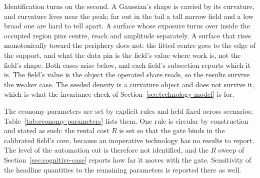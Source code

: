 \documentclass[12pt, a4paper]{article}
\begin{document}
Identification turns on the second. A Gaussian's shape is carried by its
curvature, and curvature lives near the peak; far out in the tail a tall
narrow field and a low broad one are hard to tell apart. A surface whose
exposure turns over inside the occupied region pins centre, reach and
amplitude separately. A surface that rises monotonically toward the
periphery does not: the fitted centre goes to the edge of the support,
and what the data pin is the field's value where work is, not the
field's shape. Both cases arise below, and each field's subsection
reports which it is. The field's value is the object the operated share
reads, so the results survive the weaker case. The seeded density is a
curvature object and does not survive it, which is what the invariance
check of Section~\ref{sec:technology-model} is for.

The economy parameters are set by explicit rules and held fixed across
scenarios; Table~\ref{tab:economy-parameters} lists them. One rule is
circular by construction and stated as such: the rental cost $R$ is set
so that the gate binds in the calibrated field's core, because an
inoperative technology has no results to report. The level of the
automation cut is therefore not identified, and the $R$ sweep of
Section~\ref{sec:cognitive-case} reports how far it moves with the
gate. Sensitivity of the headline quantities to the remaining
parameters is reported there as well.
\end{document}
